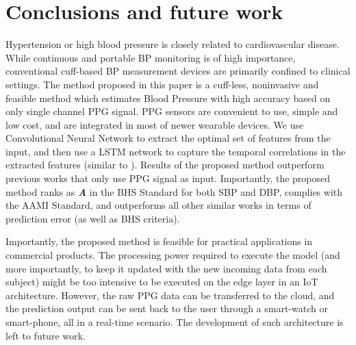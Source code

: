 \documentclass[letterpaper, 10 pt, conference]{ieeeconf}
\begin{document}
\section{Conclusions and future work} \label{sec: Conclusions}
Hypertension or high blood pressure is closely related to cardiovascular disease. While continuous and portable BP monitoring is of high importance, conventional cuff-based BP measurement devices are primarily confined to clinical settings. The method proposed in this paper is a cuff-less, noninvasive and feasible method which estimates Blood Pressure with high accuracy based on only single channel PPG signal. PPG sensors are convenient to use, simple and low cost, and are integrated in most of newer wearable devices. We use Convolutional Neural Network to extract the optimal set of features from the input, and then use a LSTM network to capture the temporal correlations in the extracted features (similar to \cite{8607019}). Results of the proposed method outperform previous works that only use PPG signal as input. Importantly, the proposed method ranks as \textbf{\textit{A}} in the BHS Standard for both SBP and DBP, complies with the AAMI Standard, and outperforms all other similar works in terms of prediction error (as well as BHS criteria).

Importantly, the proposed method is feasible for practical applications in commercial products. The processing power required to execute the model (and more importantly, to keep it updated with the new incoming data from each subject) might be too intensive to be executed on the edge layer in an IoT architecture. However, the raw PPG data can be transferred to the cloud, and the prediction output can be sent back to the user through a smart-watch or smart-phone, all in a real-time scenario. The development of such architecture is left to future work.
\vspace{-2ex}


\end{document}
